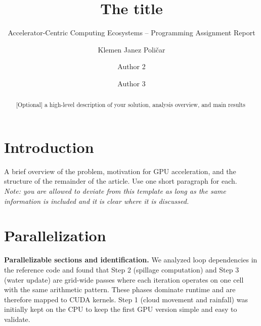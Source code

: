 \documentclass[sigconf, nonacm, review]{acmart}
\begin{document}
\title{The title}
\subtitle{Accelerator-Centric Computing Ecosystems -- Programming Assignment Report }



\author{Klemen Janez Poličar}

\author{Author 2}
\author{Author 3}


\begin{abstract}
  [Optional]  a high-level description of your solution, analysis overview, and main results
\end{abstract}




\maketitle

\section{Introduction}
A brief overview of the problem, motivation for GPU acceleration, and the structure of the remainder of the article. Use one short paragraph for each.\\

\noindent
\textit{Note: you are allowed to deviate from this template as long as the same information is included and it is clear where it is discussed.}

\section{Parallelization}
\textbf{Parallelizable sections and identification.}
We analyzed loop dependencies in the reference code and found that Step 2 (spillage computation) and Step 3 (water update) are grid-wide passes where each iteration operates on one cell with the same arithmetic pattern. These phases dominate runtime and are therefore mapped to CUDA kernels. Step 1 (cloud movement and rainfall) was initially kept on the CPU to keep the first GPU version simple and easy to validate.
\end{document}
